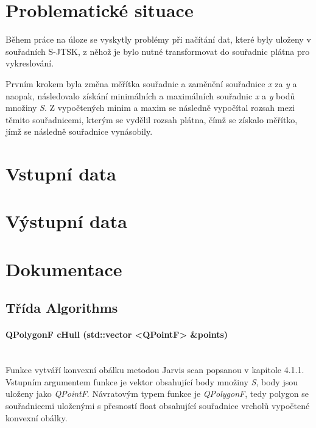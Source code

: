 \documentclass[11pt]{article}
\begin{document}
		\section{Problematické situace}
		Během práce na úloze se vyskytly problémy při načítání dat, které byly uloženy v souřadních S-JTSK, z něhož je bylo nutné transformovat do souřadnic plátna pro vykreslování. 
		
		Prvním krokem byla změna měřítka souřadnic a zaměnění souřadnice \textit{x} za \textit{y} a naopak, následovalo získání minimálních a maximálních souřadnic \textit{x} a \textit{y} bodů množiny \textit{S}. Z vypočtených minim a maxim se následně vypočítal rozsah mezi těmito souřadnicemi, kterým se vydělil rozsah plátna, čímž se získalo měřítko, jímž se následně souřadnice vynásobily.
		
		
		
		
		\section{Vstupní data}
		

		
		
		\section{Výstupní data}
		
		
		
		\section{Dokumentace}

		
		\subsection{Třída Algorithms}
		\paragraph{QPolygonF cHull (std::vector <QPointF> \&points)}\mbox{}\\
		Funkce vytváří konvexní obálku metodou Jarvis scan popsanou v kapitole 4.1.1. Vstupním argumentem funkce je vektor obsahující body množiny \textit{S}, body jsou uloženy jako \textit{QPointF}. 	Návratovým typem funkce je \textit{QPolygonF}, tedy polygon se souřadnicemi uloženými s přesností float obsahující souřadnice vrcholů vypočtené konvexní obálky.
		
\end{document}
